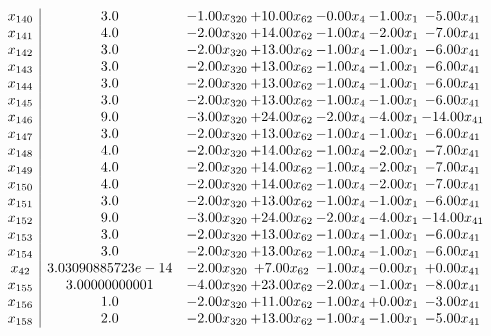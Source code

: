 \documentclass[8pt]{article}
\begin{document}
\[\begin{array}{c| c c@{\hskip 2pt} c@{\hskip 2pt} c@{\hskip 2pt} c@{\hskip 2pt} c@{\hskip 2pt} }
 x_{140}   &  3.0 & -1.00 x_{320} & + 10.00 x_{62} & -0.00 x_{4} & -1.00 x_{1} & -5.00 x_{41}\\
 x_{141}   &  4.0 & -2.00 x_{320} & + 14.00 x_{62} & -1.00 x_{4} & -2.00 x_{1} & -7.00 x_{41}\\
 x_{142}   &  3.0 & -2.00 x_{320} & + 13.00 x_{62} & -1.00 x_{4} & -1.00 x_{1} & -6.00 x_{41}\\
 x_{143}   &  3.0 & -2.00 x_{320} & + 13.00 x_{62} & -1.00 x_{4} & -1.00 x_{1} & -6.00 x_{41}\\
 x_{144}   &  3.0 & -2.00 x_{320} & + 13.00 x_{62} & -1.00 x_{4} & -1.00 x_{1} & -6.00 x_{41}\\
 x_{145}   &  3.0 & -2.00 x_{320} & + 13.00 x_{62} & -1.00 x_{4} & -1.00 x_{1} & -6.00 x_{41}\\
 x_{146}   &  9.0 & -3.00 x_{320} & + 24.00 x_{62} & -2.00 x_{4} & -4.00 x_{1} & -14.00 x_{41}\\
 x_{147}   &  3.0 & -2.00 x_{320} & + 13.00 x_{62} & -1.00 x_{4} & -1.00 x_{1} & -6.00 x_{41}\\
 x_{148}   &  4.0 & -2.00 x_{320} & + 14.00 x_{62} & -1.00 x_{4} & -2.00 x_{1} & -7.00 x_{41}\\
 x_{149}   &  4.0 & -2.00 x_{320} & + 14.00 x_{62} & -1.00 x_{4} & -2.00 x_{1} & -7.00 x_{41}\\
 x_{150}   &  4.0 & -2.00 x_{320} & + 14.00 x_{62} & -1.00 x_{4} & -2.00 x_{1} & -7.00 x_{41}\\
 x_{151}   &  3.0 & -2.00 x_{320} & + 13.00 x_{62} & -1.00 x_{4} & -1.00 x_{1} & -6.00 x_{41}\\
 x_{152}   &  9.0 & -3.00 x_{320} & + 24.00 x_{62} & -2.00 x_{4} & -4.00 x_{1} & -14.00 x_{41}\\
 x_{153}   &  3.0 & -2.00 x_{320} & + 13.00 x_{62} & -1.00 x_{4} & -1.00 x_{1} & -6.00 x_{41}\\
 x_{154}   &  3.0 & -2.00 x_{320} & + 13.00 x_{62} & -1.00 x_{4} & -1.00 x_{1} & -6.00 x_{41}\\
 x_{42}   &  3.03090885723e-14 & -2.00 x_{320} & +  7.00 x_{62} & -1.00 x_{4} & -0.00 x_{1} & +  0.00 x_{41}\\
 x_{155}   &  3.00000000001 & -4.00 x_{320} & + 23.00 x_{62} & -2.00 x_{4} & -1.00 x_{1} & -8.00 x_{41}\\
 x_{156}   &  1.0 & -2.00 x_{320} & + 11.00 x_{62} & -1.00 x_{4} & +  0.00 x_{1} & -3.00 x_{41}\\
 x_{158}   &  2.0 & -2.00 x_{320} & + 13.00 x_{62} & -1.00 x_{4} & -1.00 x_{1} & -5.00 x_{41}\\

\end{array}\]
\end{document}
